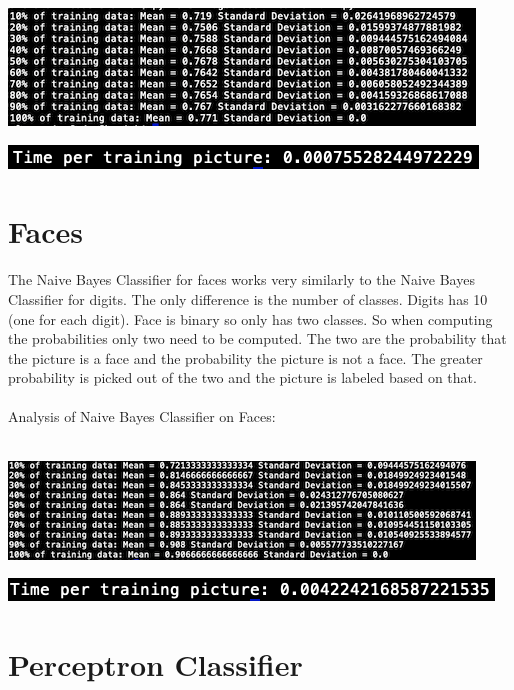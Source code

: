 \documentclass[12pt]{article}
\begin{document}
\begin{center}
\includegraphics{statsDigBayes.png}
\end{center}

\begin{center}
\includegraphics{timeStatsDigBayes.png}
\end{center}

\section*{Faces}
The Naive Bayes Classifier for faces works very similarly to the Naive Bayes Classifier for digits. The only difference is the number of classes. Digits has 10 (one for each digit). Face is binary so only has two classes. So when computing the probabilities only two need to be computed. The two are the probability that the picture is a face and the probability the picture is not a face. The greater probability is picked out of the two and the picture is labeled based on that.\\\\
Analysis of Naive Bayes Classifier on Faces:\\\\

\begin{center}
\includegraphics{statsFaceBayes.png}
\end{center}

\begin{center}
\includegraphics{timeStatsFaceBayes.png}
\end{center}

\section*{Perceptron Classifier}
\end{document}
